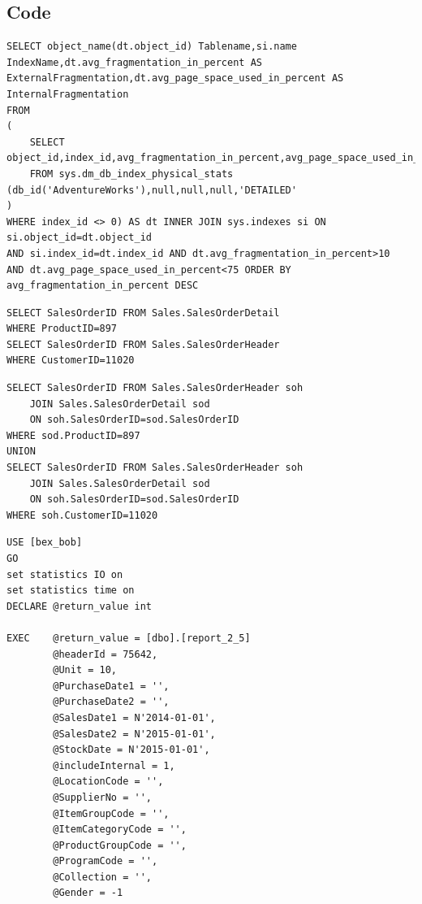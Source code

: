 \documentclass{cslthse-msc}
\begin{document}
\begin{appendices}

\chapter{Code} \label{appCode}
\begin{lstlisting}[caption={Algorithm to find fragmented tables and the fragmentation values},label=See DB-Fragmentation]
SELECT object_name(dt.object_id) Tablename,si.name
IndexName,dt.avg_fragmentation_in_percent AS
ExternalFragmentation,dt.avg_page_space_used_in_percent AS
InternalFragmentation
FROM
(
    SELECT object_id,index_id,avg_fragmentation_in_percent,avg_page_space_used_in_percent
    FROM sys.dm_db_index_physical_stats (db_id('AdventureWorks'),null,null,null,'DETAILED'
)
WHERE index_id <> 0) AS dt INNER JOIN sys.indexes si ON si.object_id=dt.object_id
AND si.index_id=dt.index_id AND dt.avg_fragmentation_in_percent>10
AND dt.avg_page_space_used_in_percent<75 ORDER BY avg_fragmentation_in_percent DESC
\end{lstlisting}


\begin{lstlisting}[caption={Example of broken-down query, instead of OR operator in WHERE clause on two different tables},label=firstbreak-down]
SELECT SalesOrderID FROM Sales.SalesOrderDetail
WHERE ProductID=897
SELECT SalesOrderID FROM Sales.SalesOrderHeader
WHERE CustomerID=11020
\end{lstlisting}
\newpage

\begin{lstlisting}[caption={UNION instead of OR},label=second-down]
SELECT SalesOrderID FROM Sales.SalesOrderHeader soh
	JOIN Sales.SalesOrderDetail sod
	ON soh.SalesOrderID=sod.SalesOrderID
WHERE sod.ProductID=897
UNION
SELECT SalesOrderID FROM Sales.SalesOrderHeader soh
	JOIN Sales.SalesOrderDetail sod
	ON soh.SalesOrderID=sod.SalesOrderID
WHERE soh.CustomerID=11020
\end{lstlisting} 


\begin{lstlisting}[caption={SQL batch to execute stored procedure report\_2\_5},label=spexec]
USE [bex_bob]
GO
set statistics IO on
set statistics time on
DECLARE	@return_value int

EXEC	@return_value = [dbo].[report_2_5]
		@headerId = 75642,
		@Unit = 10,
		@PurchaseDate1 = '',
		@PurchaseDate2 = '',
		@SalesDate1 = N'2014-01-01',
		@SalesDate2 = N'2015-01-01',
		@StockDate = N'2015-01-01',
		@includeInternal = 1,
		@LocationCode = '',
		@SupplierNo = '',
		@ItemGroupCode = '',
		@ItemCategoryCode = '',
		@ProductGroupCode = '',
		@ProgramCode = '',
		@Collection = '',
		@Gender = -1


\end{lstlisting}
\end{appendices}
\end{document}
